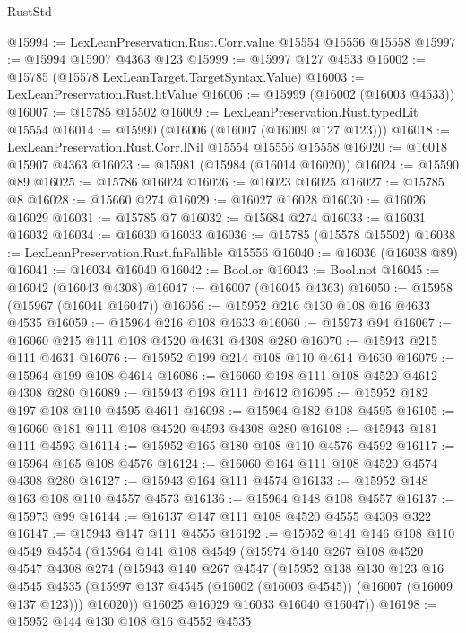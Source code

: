 \begin{lexlean}{RustStd}
\begin{coremodule}
@15994 := LexLeanPreservation.Rust.Corr.value @15554 @15556 @15558
@15997 := @15994 @15907 @4363 @123
@15999 := @15997 @127 @4533
@16002 := @15785 (@15578 LexLeanTarget.TargetSyntax.Value)
@16003 := LexLeanPreservation.Rust.litValue
@16006 := @15999 (@16002 (@16003 @4533))
@16007 := @15785 @15502
@16009 := LexLeanPreservation.Rust.typedLit @15554
@16014 := @15990 (@16006 (@16007 (@16009 @127 @123)))
@16018 := LexLeanPreservation.Rust.Corr.lNil @15554 @15556 @15558
@16020 := @16018 @15907 @4363
@16023 := @15981 (@15984 (@16014 @16020))
@16024 := @15590 @89
@16025 := @15786 @16024
@16026 := @16023 @16025
@16027 := @15785 @8
@16028 := @15660 @274
@16029 := @16027 @16028
@16030 := @16026 @16029
@16031 := @15785 @7
@16032 := @15684 @274
@16033 := @16031 @16032
@16034 := @16030 @16033
@16036 := @15785 (@15578 @15502)
@16038 := LexLeanPreservation.Rust.fnFallible @15556
@16040 := @16036 (@16038 @89)
@16041 := @16034 @16040
@16042 := Bool.or
@16043 := Bool.not
@16045 := @16042 (@16043 @4308)
@16047 := @16007 (@16045 @4363)
@16050 := @15958 (@15967 (@16041 @16047))
@16056 := @15952 @216 @130 @108 @16 @4633 @4535
@16059 := @15964 @216 @108 @4633
@16060 := @15973 @94
@16067 := @16060 @215 @111 @108 @4520 @4631 @4308 @280
@16070 := @15943 @215 @111 @4631
@16076 := @15952 @199 @214 @108 @110 @4614 @4630
@16079 := @15964 @199 @108 @4614
@16086 := @16060 @198 @111 @108 @4520 @4612 @4308 @280
@16089 := @15943 @198 @111 @4612
@16095 := @15952 @182 @197 @108 @110 @4595 @4611
@16098 := @15964 @182 @108 @4595
@16105 := @16060 @181 @111 @108 @4520 @4593 @4308 @280
@16108 := @15943 @181 @111 @4593
@16114 := @15952 @165 @180 @108 @110 @4576 @4592
@16117 := @15964 @165 @108 @4576
@16124 := @16060 @164 @111 @108 @4520 @4574 @4308 @280
@16127 := @15943 @164 @111 @4574
@16133 := @15952 @148 @163 @108 @110 @4557 @4573
@16136 := @15964 @148 @108 @4557
@16137 := @15973 @99
@16144 := @16137 @147 @111 @108 @4520 @4555 @4308 @322
@16147 := @15943 @147 @111 @4555
@16192 := @15952
    @141
    @146
    @108
    @110
    @4549
    @4554
    (@15964
      @141
      @108
      @4549
      (@15974
        @140
        @267
        @108
        @4520
        @4547
        @4308
        @274
        (@15943
          @140
          @267
          @4547
          (@15952
            @138
            @130
            @123
            @16
            @4545
            @4535
            (@15997 @137 @4545 (@16002 (@16003 @4545)) (@16007 (@16009 @137 @123)))
            @16020))
        @16025
        @16029
        @16033
        @16040
        @16047))
@16198 := @15952 @144 @130 @108 @16 @4552 @4535

\end{coremodule}
\end{lexlean}
